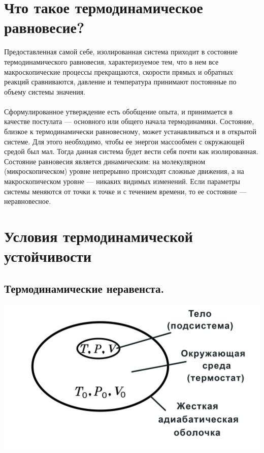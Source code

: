 \documentclass[a4paper,14pt]{article} %
\begin{document}
\section{Что такое термодинамическое равновесие?}
Предоставленная самой себе,
изолированная система приходит в состояние термодинамического равновесия, характеризуемое тем, что в нем все макроскопические процессы
прекращаются, скорости прямых и обратных реакций сравниваются, давление и температура принимают постоянные по объему системы значения.
\\\\
Сформулированное утверждение есть обобщение опыта, и принимается
в качестве постулата — основного или общего начала термодинамики.
Состояние, близкое к термодинамически равновесному, может устанавливаться и в открытой системе. Для этого необходимо, чтобы ее энергои массообмен с окружающей средой был мал. Тогда данная система будет
вести себя почти как изолированная.
Состояние равновесия является динамическим: на молекулярном (микроскопическом) уровне непрерывно происходят сложные движения, а на
макроскопическом уровне — никаких видимых изменений.
Если параметры системы меняются от точки к точке и с течением
времени, то ее состояние — неравновесное.

\section{Условия термодинамической устойчивости}

\subsection{ Термодинамические неравенста.}

\begin{center}
	{\centering \includegraphics[scale=0.1]{PICTURE_1.jpg}}	
\end{center}
\end{document}
